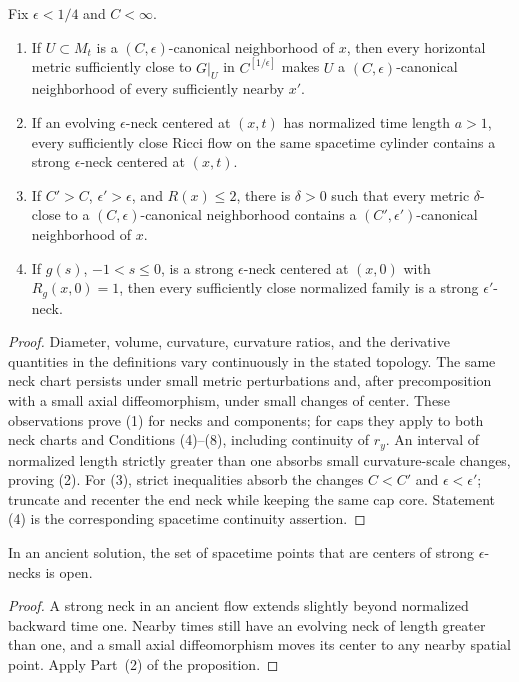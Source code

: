 \begin{proposition}\label{prop:canonical-neighborhood-stability}
\label{canonvary}
Fix $\epsilon<1/4$ and $C<\infty$.
\begin{enumerate}
\item[(1)] If $U\subset M_t$ is a $(C,\epsilon)$-canonical
neighborhood of $x$, then every horizontal metric sufficiently
close to $G|_U$ in $C^{[1/\epsilon]}$ makes $U$ a
$(C,\epsilon)$-canonical neighborhood of every sufficiently nearby
$x'$.
\item[(2)] If an evolving $\epsilon$-neck centered at $(x,t)$ has
normalized time length $a>1$, every sufficiently close Ricci flow on
the same spacetime cylinder contains a strong $\epsilon$-neck
centered at $(x,t)$.
\item[(3)] If $C'>C$, $\epsilon'>\epsilon$, and $R(x)\leq2$, there
is $\delta>0$ such that every metric $\delta$-close to a
$(C,\epsilon)$-canonical neighborhood contains a
$(C',\epsilon')$-canonical neighborhood of $x$.
\item[(4)] If $g(s)$, $-1<s\leq0$, is a strong $\epsilon$-neck
centered at $(x,0)$ with $R_g(x,0)=1$, then every sufficiently close
normalized family is a strong $\epsilon'$-neck.
\end{enumerate}
\end{proposition}
\begin{proof}
\sketch Diameter, volume, curvature, curvature ratios, and the
derivative quantities in the definitions vary continuously in the
stated topology. The same neck chart persists under small metric
perturbations and, after precomposition with a small axial
diffeomorphism, under small changes of center. These observations
prove (1) for necks and components; for caps they apply to both neck
charts and Conditions (4)--(8), including continuity of $r_y$.
An interval of normalized length strictly greater than one absorbs
small curvature-scale changes, proving (2). For (3), strict
inequalities absorb the changes $C<C'$ and
$\epsilon<\epsilon'$; truncate and recenter the end neck while
keeping the same cap core. Statement (4) is the corresponding
spacetime continuity assertion.
\end{proof}

\begin{corollary}\label{cor:strong-neck-centers-open}
\label{strepsopen}
In an ancient solution, the set of spacetime points that are centers
of strong $\epsilon$-necks is open.
\end{corollary}
\begin{proof}
\sketch
{}
A strong neck in an ancient flow extends slightly beyond normalized
backward time one. Nearby times still have an evolving neck of
length greater than one, and a small axial diffeomorphism moves its
center to any nearby spatial point. Apply Part~(2) of the
proposition.
\end{proof}

